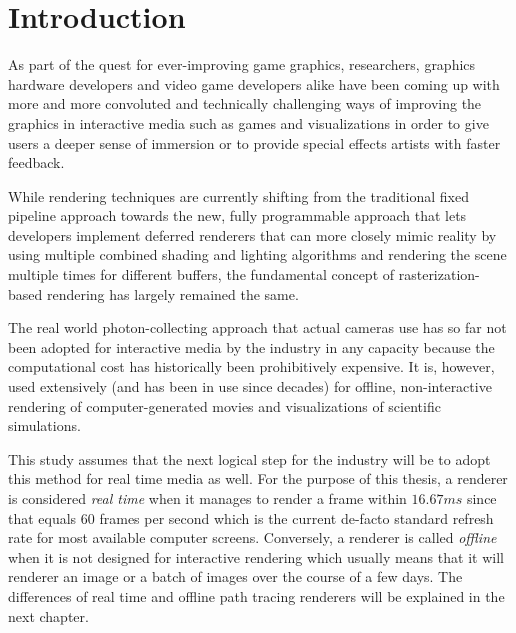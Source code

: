 \documentclass[
  twoside,
  11pt, a4paper,
  footinclude=true,
  headinclude=true,
  cleardoublepage=empty
]{scrreprt}
\begin{document}
\tableofcontents

\chapter{Introduction}
As part of the quest for ever-improving game graphics, researchers, graphics hardware developers
and video game developers alike have been coming up with more and more convoluted and technically
challenging ways of improving the graphics in interactive media such as games and visualizations in order to give
users a deeper sense of immersion or to provide special effects artists with faster feedback.

While rendering techniques are currently shifting from the traditional fixed pipeline approach
towards the new, fully programmable approach that lets developers implement deferred renderers that
can more closely mimic reality by using multiple combined shading and lighting algorithms and
rendering the scene multiple times for different buffers, the
fundamental concept of rasterization-based rendering has largely remained the same.

The real world photon-collecting approach that actual cameras use has so far not been adopted for
interactive media by the industry in any capacity because the computational cost has historically
been prohibitively expensive. It is, however, used extensively (and has been in use since decades)
for offline, non-interactive rendering of computer-generated movies and visualizations of scientific simulations.

This study assumes that the next logical step for the industry will be to adopt
this method for real time media as well. For the purpose of this thesis, a renderer is considered
\textit{real time} when it manages to render a frame within \(16.67ms\) since that equals 60 frames per second
which is the current de-facto standard refresh rate for most available computer screens.
Conversely, a renderer is called \textit{offline} when it is not designed for interactive rendering
which usually means that it will renderer an image or a batch of images over the course of a few
days. The differences of real time and offline path tracing renderers will be explained in the next
chapter.
\end{document}
